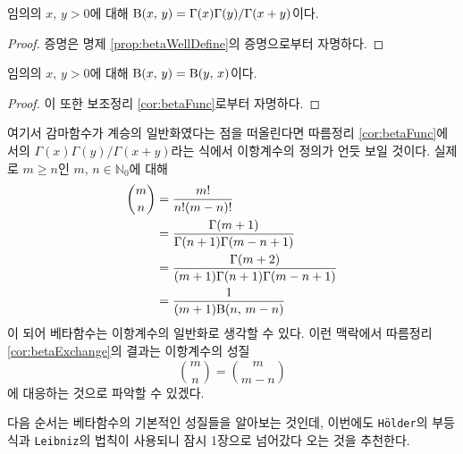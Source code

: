 \begin{corollary}\label{cor:betaFunc}
    임의의 $x,\,y>0$에 대해 $\mathrm{B}(x,\,y)=\Gamma(x)\Gamma(y)/\Gamma(x+y)$이다.
\end{corollary}

\begin{proof}
    증명은 명제 \ref{prop:betaWellDefine}의 증명으로부터 자명하다.
\end{proof}

\begin{corollary}\label{cor:betaExchange}
    임의의 $x,\,y>0$에 대해 $\mathrm{B}(x,\,y)=\mathrm{B}(y,\,x)$이다.
\end{corollary}

\begin{proof}
    이 또한 보조정리 \ref{cor:betaFunc}로부터 자명하다.
\end{proof}

여기서 감마함수가 계승의 일반화였다는 점을 떠올린다면 따름정리 \ref{cor:betaFunc}에서의 $\Gamma(x)\Gamma(y)/\Gamma(x+y)$라는 식에서 이항계수의 정의가 언듯 보일 것이다. 실제로 $m\geq n$인 $m,\,n\in\mathbb{N}_0$에 대해
\begin{align*}
    \binom{m}{n}&=\frac{m!}{n!(m-n)!}\\
    &=\frac{\Gamma(m+1)}{\Gamma(n+1)\Gamma(m-n+1)}\\
    &=\frac{\Gamma(m+2)}{(m+1)\Gamma(n+1)\Gamma(m-n+1)}\\
    &=\frac{1}{(m+1)\mathrm{B}(n,\,m-n)}
\end{align*}
이 되어 베타함수는 이항계수의 일반화로 생각할 수 있다. 이런 맥락에서 따름정리 \ref{cor:betaExchange}의 결과는 이항계수의 성질
\begin{equation*}
    \binom{m}{n}=\binom{m}{m-n}
\end{equation*}
에 대응하는 것으로 파악할 수 있겠다.

다음 순서는 베타함수의 기본적인 성질들을 알아보는 것인데, 이번에도 \texttt{H\"older}의 부등식과 \texttt{Leibniz}의 법칙이 사용되니 잠시 1장으로 넘어갔다 오는 것을 추천한다.

